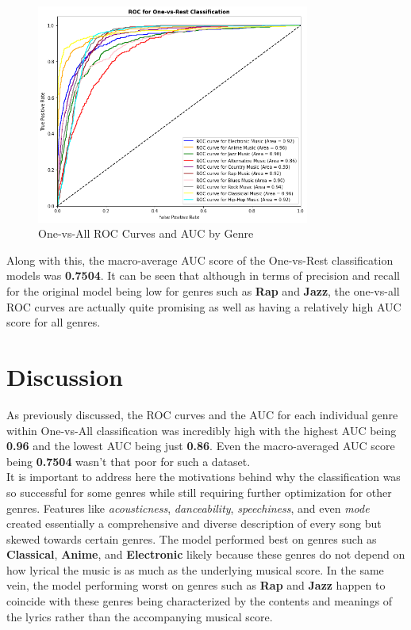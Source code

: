 \documentclass[12pt]{article}
\begin{document}
\begin{figure}[htbp]
  \centering
  \vspace{-0.075cm}
  \includegraphics[width=0.8\textwidth]{one-vs-all.png}
  \caption{One-vs-All ROC Curves and AUC by Genre}
  \label{One-Vs-All Graph}
\end{figure}

\noindent
Along with this, the macro-average AUC score of the One-vs-Rest classification models was \textbf{0.7504}. It can be seen that although in terms of precision and recall for the original model being low for genres such as \textbf{Rap} and \textbf{Jazz}, the one-vs-all ROC curves are actually quite promising as well as having a relatively high AUC score for all genres. 

\section{Discussion}
As previously discussed, the ROC curves and the AUC for each individual genre within One-vs-All classification was incredibly high with the highest AUC being \textbf{0.96} and the lowest AUC being just \textbf{0.86}. Even the macro-averaged AUC score being \textbf{0.7504} wasn't that poor for such a dataset. \\

\noindent
It is important to address here the motivations behind why the classification was so successful for some genres while still requiring further optimization for other genres. Features like \textit{acousticness}, \textit{danceability}, \textit{speechiness}, and even \textit{mode} created essentially a comprehensive and diverse description of every song but skewed towards certain genres. The model performed best on genres such as \textbf{Classical}, \textbf{Anime}, and \textbf{Electronic} likely because these genres do not depend on how lyrical the music is as much as the underlying musical score. In the same vein, the model performing worst on genres such as \textbf{Rap} and \textbf{Jazz} happen to coincide with these genres being characterized by the contents and meanings of the lyrics rather than the accompanying musical score.
\end{document}
